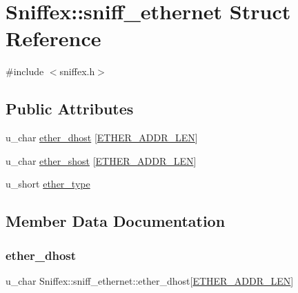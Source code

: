 \hypertarget{structSniffex_1_1sniff__ethernet}{}\section{Sniffex\+:\+:sniff\+\_\+ethernet Struct Reference}
\label{structSniffex_1_1sniff__ethernet}


{\ttfamily \#include $<$sniffex.\+h$>$}

\subsection*{Public Attributes}
\begin{DoxyCompactItemize}
\item 
u\+\_\+char \mbox{\hyperlink{structSniffex_1_1sniff__ethernet_a68600307767c3cfe20ba593423abec8b}{ether\+\_\+dhost}} \mbox{[}\mbox{\hyperlink{sniffex_8h_abf4fcaacb1ad2010711b7c880ec2ed20}{E\+T\+H\+E\+R\+\_\+\+A\+D\+D\+R\+\_\+\+L\+EN}}\mbox{]}
\item 
u\+\_\+char \mbox{\hyperlink{structSniffex_1_1sniff__ethernet_af40407403f51872c064c28298441b2d9}{ether\+\_\+shost}} \mbox{[}\mbox{\hyperlink{sniffex_8h_abf4fcaacb1ad2010711b7c880ec2ed20}{E\+T\+H\+E\+R\+\_\+\+A\+D\+D\+R\+\_\+\+L\+EN}}\mbox{]}
\item 
u\+\_\+short \mbox{\hyperlink{structSniffex_1_1sniff__ethernet_a31b8a8e9232feffeeb747f949580753a}{ether\+\_\+type}}
\end{DoxyCompactItemize}


\subsection{Member Data Documentation}
\mbox{\label{structSniffex_1_1sniff__ethernet_a68600307767c3cfe20ba593423abec8b}} 
\subsubsection{\texorpdfstring{ether\+\_\+dhost}{ether\_dhost}}
{\footnotesize\ttfamily u\+\_\+char Sniffex\+::sniff\+\_\+ethernet\+::ether\+\_\+dhost\mbox{[}\mbox{\hyperlink{sniffex_8h_abf4fcaacb1ad2010711b7c880ec2ed20}{E\+T\+H\+E\+R\+\_\+\+A\+D\+D\+R\+\_\+\+L\+EN}}\mbox{]}}


